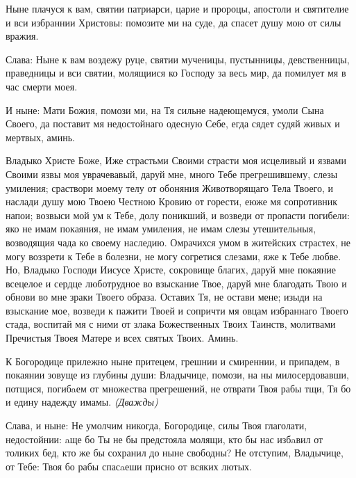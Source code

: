 Ныне плачуся к вам, святии патриарси, царие и пророцы, апостоли и святителие и вси избраннии Христовы: помозите ми на суде, да спасет душу мою от силы вражия.


Слава: Ныне к вам воздежу руце, святии мученицы, пустынницы, девственницы, праведницы и вси святии, молящиися ко Господу за весь мир, да помилует мя в час смерти моея.


И ныне: Мати Божия, помози ми, на Тя сильне надеющемуся, умоли Сына Своего, да поставит мя недостойнаго одесную Себе, егда сядет судяй живых и мертвых, аминь.




Владыко Христе Боже, Иже страстьми Своими страсти моя исцеливый и язвами Своими язвы моя уврачевавый, даруй мне, много Тебе прегрешившему, слезы умиления; сраствори моему телу от обоняния Животворящаго Тела Твоего, и наслади душу мою Твоею Честною Кровию от горести, еюже мя сопротивник напои; возвыси мой ум к Тебе, долу поникший, и возведи от пропасти погибели: яко не имам покаяния, не имам умиления, не имам слезы утешительныя, возводящия чада ко своему наследию. Омрачихся умом в житейских страстех, не могу воззрети к Тебе в болезни, не могу согретися слезами, яже к Тебе любве. Но, Владыко Господи Иисусе Христе, сокровище благих, даруй мне покаяние всецелое и сердце люботрудное во взыскание Твое, даруй мне благодать Твою и обнови во мне зраки Твоего образа. Оставих Тя, не остави мене; изыди на взыскание мое, возведи к пажити Твоей и сопричти мя овцам избраннаго Твоего стада, воспитай мя с ними от злака Божественных Твоих Таинств, молитвами Пречистыя Твоея Матере и всех святых Твоих. Аминь.
\longpage{}\mychapterending[1.5]

 





 К Богородице прилежно ныне притецем, грешнии и смиреннии, и припадем, в покаянии зовуще из глубины души: Владычице, помози, на ны милосердовавши, потщися, погибaем от множества прегрешений, не отврати Твоя рабы тщи, Тя бо и едину надежду имамы. \itshape (Дважды)\normalfont{}


 Слава, и ныне: Не умолчим никогда, Богородице, силы Твоя глаголати, недостойнии: aще бо Ты не бы предстояла молящи, кто бы нас избaвил от толиких бед, кто же бы сохранил до ныне свободны? Не отступим, Владычице, от Тебе: Твоя бо рабы спасaеши присно от всяких лютых.


